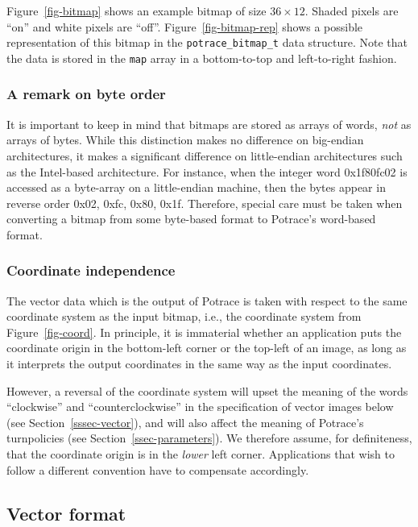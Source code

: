 \documentclass{article}
\begin{document}
Figure~\ref{fig-bitmap} shows an example bitmap of size $36\times 12$.
Shaded pixels are ``on'' and white pixels are ``off''.
Figure~\ref{fig-bitmap-rep} shows a possible representation of this
bitmap in the \verb!potrace_bitmap_t! data structure. Note that the
data is stored in the \verb!map! array in a bottom-to-top and
left-to-right fashion.


\subsubsection{A remark on byte order}

It is important to keep in mind that bitmaps are stored as arrays of
words, {\em not} as arrays of bytes. While this distinction makes no
difference on big-endian architectures, it makes a significant
difference on little-endian architectures such as the Intel-based
architecture. For instance, when the integer word 0x1f80fc02 is
accessed as a byte-array on a little-endian machine, then the bytes
appear in reverse order 0x02, 0xfc, 0x80, 0x1f. Therefore, special
care must be taken when converting a bitmap from some byte-based
format to Potrace's word-based format.

\subsubsection{Coordinate independence}

The vector data which is the output of Potrace is taken with respect
to the same coordinate system as the input bitmap, i.e., the
coordinate system from Figure~\ref{fig-coord}. In principle, it is
immaterial whether an application puts the coordinate origin in the
bottom-left corner or the top-left of an image, as long as it
interprets the output coordinates in the same way as the input
coordinates.

However, a reversal of the coordinate system will upset the meaning of
the words ``clockwise'' and ``counterclockwise'' in the specification
of vector images below (see Section~\ref{sssec-vector}), and will also
affect the meaning of Potrace's turnpolicies (see
Section~\ref{ssec-parameters}). We therefore assume, for definiteness,
that the coordinate origin is in the {\em lower} left corner.
Applications that wish to follow a different convention have to
compensate accordingly.

\subsection{Vector format}
\end{document}
